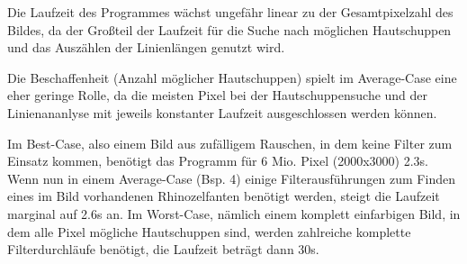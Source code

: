 Die Laufzeit des Programmes wächst ungefähr linear zu der Gesamtpixelzahl des Bildes, da der Großteil der Laufzeit für die Suche nach möglichen Hautschuppen und das Auszählen der Linienlängen genutzt wird.

Die Beschaffenheit (Anzahl möglicher Hautschuppen) spielt im Average-Case eine eher geringe Rolle, da die meisten Pixel bei der Hautschuppensuche und der Linienananlyse mit jeweils konstanter Laufzeit ausgeschlossen werden können.

Im Best-Case, also einem Bild aus zufälligem Rauschen, in dem keine Filter zum Einsatz kommen, benötigt das Programm für 6 Mio. Pixel (2000x3000) 2.3s. 
Wenn nun in einem Average-Case (Bsp. 4) einige Filterausführungen zum Finden eines im Bild vorhandenen Rhinozelfanten benötigt werden, steigt die Laufzeit marginal auf 2.6s an. 
Im Worst-Case, nämlich einem komplett einfarbigen Bild, in dem alle Pixel mögliche Hautschuppen sind, werden zahlreiche komplette Filterdurchläufe benötigt, die Laufzeit beträgt dann 30s.